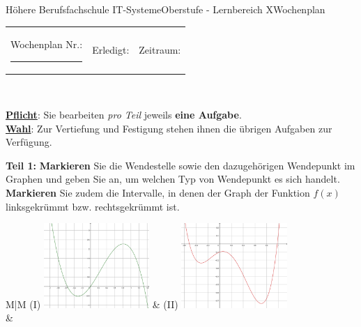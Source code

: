 \documentclass[oneside,openany,headings=optiontotoc,11pt,numbers=noenddot]{scrreprt}
\begin{document}
	\begin{worksheet}{Höhere Berufsfachschule IT-Systeme}{Oberstufe - Lernbereich X}{Wochenplan }
		\noindent
		\begin{tabularx}{\textwidth}{XXl}
			Wochenplan Nr.: \rule{0.15\textwidth}{1pt} & Erledigt: & Zeitraum: \underline{}
		\end{tabularx}\\
		\par\noindent
		\textbf{\underline{Pflicht}}: Sie bearbeiten \textit{pro Teil} jeweils \textbf{eine Aufgabe}.\\
		\underline{\textbf{Wahl}}: Zur Vertiefung und Festigung stehen ihnen die übrigen Aufgaben zur Verfügung.
		\begin{framed}
			\noindent
			\textbf{Teil 1:} \textbf{Markieren} Sie die Wendestelle sowie den dazugehörigen Wendepunkt im Graphen und geben Sie an, um welchen Typ von Wendepunkt es sich handelt.\\
			\textbf{Markieren} Sie zudem die Intervalle, in denen der Graph der Funktion \(f(x)\) linksgekrümmt bzw. rechtsgekrümmt ist.\\
			\par\noindent
			\begin{tabularx}{\textwidth}{M|M}
				(I) \includegraphics[width=0.3\textwidth,align=c]{../99_Bilder/WP/WP15_T11.png} & (II) \includegraphics[width=0.3\textwidth,align=c]{../99_Bilder/WP/WP15_T12.png}\\
				& \\
				\hline
				\\

\end{tabularx}
\end{framed}
\end{worksheet}
\end{document}
